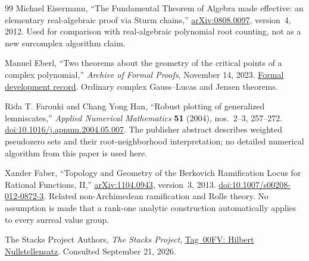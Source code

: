 \documentclass[11pt,letterpaper]{article}
\numberwithin{equation}{section}
\theoremstyle{definition}
\theoremstyle{remark}
\begin{document}
\begin{thebibliography}{99}
Michael Eisermann, ``The Fundamental Theorem of Algebra made effective:
an elementary real-algebraic proof via Sturm chains,''
\href{https://arxiv.org/abs/0808.0097}{arXiv:0808.0097}, version~4, 2012.
Used for comparison with real-algebraic polynomial root counting,
not as a new surcomplex algorithm claim.

Manuel Eberl, ``Two theorems about the geometry of the critical points of
a complex polynomial,'' \emph{Archive of Formal Proofs}, November 14,
2023.
\href{https://isa-afp.org/entries/Polynomial_Crit_Geometry.html}{Formal development record}.
Ordinary complex Gauss--Lucas and Jensen theorems.

Rida T. Farouki and Chang Yong Han,
``Robust plotting of generalized lemniscates,''
\emph{Applied Numerical Mathematics} \textbf{51} (2004), nos.~2--3,
257--272.
\href{https://doi.org/10.1016/j.apnum.2004.05.007}{doi:10.1016/j.apnum.2004.05.007}.
The publisher abstract describes weighted pseudozero sets and their
root-neighborhood interpretation; no detailed numerical algorithm from
this paper is used here.

Xander Faber, ``Topology and Geometry of the Berkovich Ramification Locus
for Rational Functions, II,''
\href{https://arxiv.org/abs/1104.0943}{arXiv:1104.0943}, version~3, 2013.
\href{https://doi.org/10.1007/s00208-012-0872-3}{doi:10.1007/s00208-012-0872-3}.
Related non-Archimedean ramification and Rolle theory. No assumption is
made that a rank-one analytic construction automatically applies to every
surreal value group.

The Stacks Project Authors, \emph{The Stacks Project},
\href{https://stacks.math.columbia.edu/tag/00FV}{Tag~00FV: Hilbert
Nullstellensatz}. Consulted September 21, 2026.

\end{thebibliography}
\end{document}
